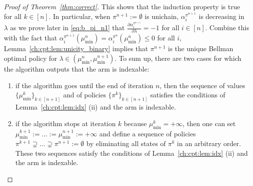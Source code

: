\begin{proof}[Proof of Theorem~\ref{thm:correct}]
    This shows that the induction property is true for all $k\in[n]$.
    In particular, when $\pi^{n+1}:=\emptyset$ is unichain, $\alpha^{\pi^{n+1}}_i$ is decreasing in $\lambda$ as we prove later in \eqref{eq:b_pi_n1} that $\frac{\partial \alpha^{\pi^{n+1}}_i}{\partial \lambda} =-1$ for all $i\in[n]$.
    Combine this with the fact that $\alpha^{\pi^{n+1}}_i(\mu^{n}_{\min}) =\alpha^{\pi^{n}}_i(\mu^{n}_{\min})\le0$ for all $i$, Lemma~\ref{ch:cpt:lem:unicity_binary} implies that $\pi^{n+1}$ is the unique Bellman optimal policy for $\lambda\in(\mu^n_{\min},\mu^{n+1}_{\min})$.
    To sum up, there are two cases for which the algorithm outputs that the arm is indexable:
    \begin{enumerate}
        \item if the algorithm goes until the end of iteration $n$, then the sequence of values $\{\mu^k_{\min}\}_{k\in[n+1]}$ and of policies $\{\pi^k\}_{k\in[n+1]}$ satisfies the conditions of Lemma~\ref{ch:cpt:lem:idx} (ii) and the arm is indexable.
        \item if the algorithm stops at iteration $k$ because $\mu^k_{\min}=+\infty$, then one can set $\mu^{k+1}_{\min}:=\dots:=\mu^{n+1}_{\min}:=+\infty$ and define a sequence of policies $\pi^{k+1}\supsetneq\dots\supsetneq\pi^{n+1}:=\emptyset$ by eliminating all states of $\pi^k$ in an arbitrary order. These two sequences satisfy the conditions of Lemma~\ref{ch:cpt:lem:idx} (ii) and the arm is indexable.
    \end{enumerate}
    
    \medskip


\end{proof}
